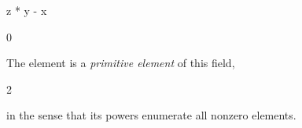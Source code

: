 {{{{{{{{{{{{{{{{\begin{xtc}
\end{xtc}
\begin{xtc}
\begin{xtccomment}
\end{xtccomment}
\begin{spadsrc}
z * y - x 
\end{spadsrc}
\begin{TeXOutput}
\begin{fricasmath}{13}
0%
\end{fricasmath}
\end{TeXOutput}
\end{xtc}
%
\begin{xtc}
\begin{xtccomment}
The element  is a {\it primitive element} of this field,
\end{xtccomment}
\begin{TeXOutput}
\begin{fricasmath}{14}
2%
\end{fricasmath}
\end{TeXOutput}
\end{xtc}
%
\begin{xtc}
\begin{xtccomment}
in the sense that its powers enumerate all nonzero elements.
\end{xtccomment}
\begin{spadsrc}
[pe^i for i in 0..99] 
\end{spadsrc}
\begin{TeXOutput}
\begin{fricasmath}{15}
\end{fricasmath}
\end{TeXOutput}
\end{xtc}}}}}}}}}}}}}}}}}
